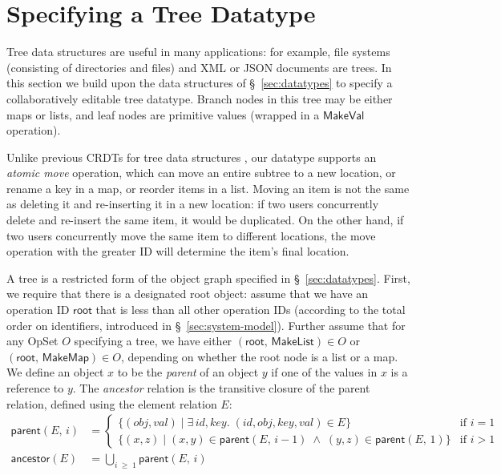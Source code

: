 \section{Specifying a Tree Datatype}\label{sec:tree}

Tree data structures are useful in many applications: for example, file systems (consisting of directories and files) and XML or JSON documents are trees.
In this section we build upon the data structures of \S~\ref{sec:datatypes} to specify a collaboratively editable tree datatype.
Branch nodes in this tree may be either maps or lists, and leaf nodes are primitive values (wrapped in a $\mathsf{MakeVal}$ operation).

Unlike previous CRDTs for tree data structures \cite{Martin:2010ih,Kleppmann:2016ve}, our datatype supports an \emph{atomic move} operation, which can move an entire subtree to a new location, or rename a key in a map, or reorder items in a list.
Moving an item is not the same as deleting it and re-inserting it in a new location: if two users concurrently delete and re-insert the same item, it would be duplicated.
On the other hand, if two users concurrently move the same item to different locations, the move operation with the greater ID will determine the item's final location.

A tree is a restricted form of the object graph specified in \S~\ref{sec:datatypes}.
First, we require that there is a designated root object: assume that we have an operation ID $\mathsf{root}$ that is less than all other operation IDs (according to the total order on identifiers, introduced in \S~\ref{sec:system-model}).
Further assume that for any OpSet $O$ specifying a tree, we have either $(\mathsf{root},\, \mathsf{MakeList}) \in O$ or $(\mathsf{root},\, \mathsf{MakeMap}) \in O$, depending on whether the root node is a list or a map.
We define an object $x$ to be the \emph{parent} of an object $y$ if one of the values in $x$ is a reference to $y$.
The \emph{ancestor} relation is the transitive closure of the parent relation, defined using the element relation $E$:
\begin{align*}
    \mathsf{parent}(E,\, i) &=
    \begin{cases}
        \big\{ (\mathit{obj}, \mathit{val}) \mid \exists\,\mathit{id}, \mathit{key}.\;
            (\mathit{id}, \mathit{obj}, \mathit{key}, \mathit{val}) \in E \big\} & \text{if } i=1 \\
        \big\{ (x, z) \mid (x, y) \in \mathsf{parent}(E,\, i-1) \;\wedge\;
            (y, z) \in \mathsf{parent}(E,\, 1) \big\} & \text{if } i > 1
    \end{cases} \\[8pt]
    \mathsf{ancestor}(E) &= \bigcup_{i \;\geq\; 1} \mathsf{parent}(E,\, i)
\end{align*}

